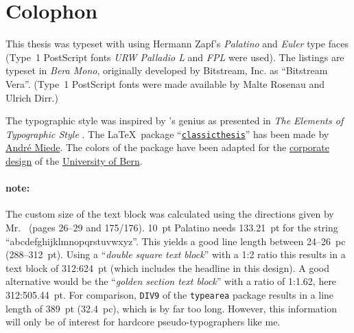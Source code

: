 \pagestyle{empty}

\hfill

\vfill


\section*{Colophon}
This thesis was typeset with \href{http://www.latex-project.org/}{\LaTeXe} using Hermann Zapf's \emph{Palatino} and \emph{Euler} type faces (Type~1 PostScript fonts \emph{URW Palladio L} and \emph{FPL} were used). The listings are typeset in \emph{Bera Mono}, originally developed by Bitstream, Inc. as ``Bitstream Vera''. (Type~1 PostScript fonts were made available by Malte Rosenau and Ulrich Dirr.)

The typographic style was inspired by 's genius as presented in \emph{The Elements of Typographic Style} \citep{bringhurst:2002}. The \LaTeX\ package ``\href{http://www.ctan.org/tex-archive/macros/latex/contrib/classicthesis/}{\texttt{classicthesis}}'' has been made by \href{http://www.miede.de}{André Miede}. The colors of the package have been adapted for the \href{http://www.kommunikation.unibe.ch/intern/content/beratung/corporate_design/logo_schriften__farben/}{corporate design} of the \href{http://www.unibe.ch/}{University of Bern}.

\paragraph{note:} The custom size of the text block was calculated using the directions given by Mr.\ \citeauthor{bringhurst:2002} (pages 26--29 and 175/176). 10~pt Palatino needs 133.21~pt for the string ``abcdefghijklmnopqrstuvwxyz''. This yields a good line length between 24--26~pc (288--312~pt). Using a ``\emph{double square text block}'' with a 1:2 ratio this results in a text block of 312:624~pt (which includes the headline in this design). A good alternative would be the ``\emph{golden section text block}'' with a ratio of 1:1.62, here 312:505.44~pt. For comparison, \texttt{DIV9} of the \texttt{typearea} package results in a line length of 389~pt (32.4~pc), which is by far too long. However, this information will only be of interest for hardcore pseudo-typographers like me.
%
%

\bigskip

\noindent\finalVersionString
